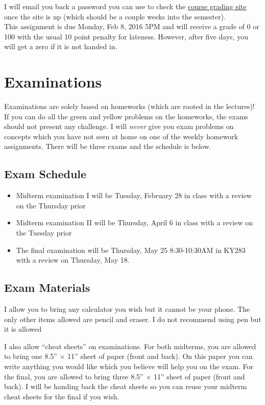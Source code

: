 \documentclass[12pt]{article}
\newcommand{\qu}[1]{``#1''}
\begin{document}
I will email you back a password you can use to check the \href{http://gradesly.com}{course grading site} once the site is up (which should be a couple weeks into the semester). \\

This assignment is due Monday, Feb 8, 2016 5PM and will receive a grade of 0 or 100 with the usual 10 point penalty for lateness. However, after five days, you will get a zero if it is not handed in.


\section*{Examinations}

Examinations are solely based on homeworks (which are rooted in the lectures)! If you can do all the green and yellow problems on the homeworks, the exams should not present any challenge. I will \textit{never} give you exam problems on concepts which you have not seen at home on one of the weekly homework assignments. There will be three exams and the schedule is below.

\subsection*{Exam Schedule}\label{subsec:exam_schedule}

\begin{itemize}
\itemsep -0.0em 
\item Midterm examination I will be Tuesday, February 28 in class with a review on the Thursday prior
\item Midterm examination II will be Thursday, April 6 in class with a review on the Tuesday prior
\item The final examination will be Thursday, May 25 8:30-10:30AM in KY283 with a review on Thursday, May 18.
\end{itemize}

\subsection*{Exam Materials}

I allow you to bring any calculator you wish but it cannot be your phone. The only other items allowed are pencil and eraser. I do not recommend using pen but it is allowed

I also allow \qu{cheat sheets} on examinations. For both midterms, you are allowed to bring one 8.5'' $\times$ 11'' sheet of paper (front and back). On this paper you can write anything you would like which you believe will help you on the exam. For the final, you are allowed to bring three 8.5'' $\times$ 11'' sheet of paper (front and back). I will be handing back the cheat sheets so you can reuse your midterm cheat sheets for the final if you wish. 
\end{document}
